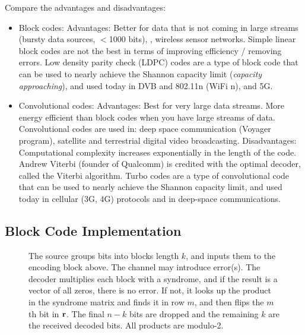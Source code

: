Compare the advantages and disadvantages:
\begin{itemize}
 \item Block codes: Advantages: Better for data that is not coming in large streams (bursty data sources, $<$1000 bits), \eg, wireless sensor networks.  Simple linear block codes are not the best in terms of improving efficiency / removing errors.  Low density parity check (LDPC) codes are a type of block code that can be used to nearly achieve the Shannon capacity limit (\emph{capacity approaching}), and used today in DVB and 802.11n (WiFi n), and 5G.
 \item Convolutional codes:  Advantages: Best for very large data streams.  More energy efficient than block codes when you have large streams of data.  Convolutional codes are used in:  deep space communication (Voyager program), satellite and terrestrial digital video broadcasting.  Disadvantages:  Computational complexity increases exponentially in the length of the code.  Andrew Viterbi (founder of Qualcomm) is credited with the optimal decoder, called the Viterbi algorithm.  Turbo codes are a type of convolutional code that can be used to nearly achieve the Shannon capacity limit, and used today in cellular (3G, 4G) protocols and in deep-space communications.
\end{itemize}


\subsection{Block Code Implementation}

\begin{figure}[htbp]
\caption{The source groups bits into blocks length $k$, and inputs them to the encoding block above.  The channel may introduce error(s). The decoder multiplies each block with a syndrome, and if the result is a vector of all zeros, there is no error.  If not, it looks up the product in the syndrome matrix and finds it in row $m$, and then flips the $m$th bit in $\mathbf{r}$.  The final $n-k$ bits are dropped and the remaining $k$ are the received  decoded bits. All products are modulo-2. }
    \label{F:block_coding_flow_chart}
\end{figure}


